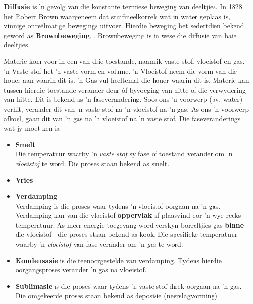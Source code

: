 \par 
\label{m38736*id10987324}\textbf{Diffusie} is 'n gevolg van die konstante termiese beweging van deeltjies. In 1828 het Robert Brown waargeneem dat stuifmeelkorrels wat in water geplaas is, vinnige onreëlmatige bewegings uitvoer. Hierdie beweging het sedertdien bekend geword as \textbf{Brownbeweging}. . Brownbeweging is in wese die diffusie van baie deeltjies.
\par 
\label{m38736*id48327}Materie kom voor in een van drie toestande, naamlik vaste stof, vloeistof en gas. 'n Vaste stof het 'n vaste vorm en volume. 'n Vloeistof neem die vorm van die houer aan waarin dit is. 'n Gas vul heeltemal die houer waarin dit is. Materie kan tussen hierdie toestande verander deur óf byvoeging van hitte of die verwydering van hitte. Dit is bekend as 'n faseverandering. Soos ons 'n voorwerp (bv. water) verhit, verander dit van 'n vaste stof na 'n vloeistof na 'n gas. As ons 'n voorwerp afkoel, gaan dit van 'n gas na 'n vloeistof na 'n vaste stof. Die faseveranderings wat jy moet ken is:
\label{m38736*id02341}\begin{itemize}[noitemsep]
\item \textbf{Smelt} \\ 
 { \label{m38734*meaningfhsst!!!underscore!!!id276}
Die temperatuur waarby 'n \textsl{vaste stof} sy fase of toestand verander om 'n \textsl{vloeistof} te word. Die proses staan bekend as smelt. } 
\item \textbf{Vries} \\
\item \textbf{Verdamping} \\
Verdamping is die proses waar tydens 'n vloeistof oorgaan na 'n gas. Verdamping kan van die vloeistof \textbf{oppervlak} af plaasvind oor 'n wye reeks temperatuur. As meer energie toegevang word verskyn borreltjies gas \textbf{binne} die vloeistof - die proses staan bekend as kook.
 { \label{m38734*meaningfhsst!!!underscore!!!id282}
Die spesifieke temperatuur waarby 'n \textsl{vloeistof} van fase verander om 'n \textsl{gas} te word.} 
\item \textbf{Kondensasie} is die teenoorgestelde van verdamping. Tydens hierdie oorgangsproses verander 'n gas na vloeistof.
\item \textbf{Sublimasie} is die proses waar tydens 'n vaste stof direk oorgaan na 'n gas. Die omgekeerde proses staan bekend as deposisie (neerslagvorming)\end{itemize}
